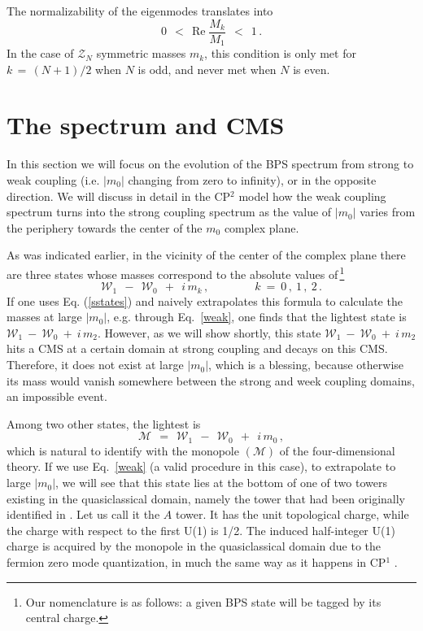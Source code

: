 \documentclass[epsfig,12pt]{article}
\def\beq{\begin{equation}}
\def\eeq{\end{equation}}
\def\beq{\begin{equation}}
\def\eeq{\end{equation}}
\newcommand{\mc}[1]{\mathcal{#1}}
\newcommand{\W}{\mathcal{W}}
\newcommand{\M}{\mathcal{M}}
\begin{document}
	The normalizability of the eigenmodes translates into
\beq
\label{norm}
	0 ~~<~~ \text{Re}\; \frac{ M_k }
                                 { M_1 } ~~<~~ 1\,.
\eeq
	In the case of $ \mc{Z}_N $ symmetric masses $ m_k $, this condition is only met for $ k \,=\, (N+1)/2 $
	when $ N $ is odd, and never met when $ N $ is even.


\section{The spectrum and CMS}
\label{secspectrum}
\setcounter{equation}{0}

	In this section we will focus on the
	evolution of the BPS spectrum from strong to weak coupling (i.e. $|m_0|$ changing from zero to infinity),
	or in the opposite direction.
	We will discuss in detail in the CP$^2$ model how the weak coupling  
	spectrum turns into the strong  coupling  
	spectrum as the value of  $| m_0| $ varies 
	from the periphery towards the center of the $m_0$ complex plane.

	As was indicated earlier, in the vicinity of the center of the complex plane there are three states
	whose masses correspond to the absolute values of\,\footnote{Our nomenclature is as follows: a given BPS state will be tagged by its central charge.}
\beq
\label{sstates}
	\W_1 ~~-~~ \W_0   ~~+~~ i\, m_k\,,   \qquad\qquad k ~=~ 0\,,~1\,,~2\,.
\eeq
	If one uses Eq. (\ref{sstates}) and  naively extrapolates this formula to calculate  the  masses at large $ |m_0| $, e.g. through Eq.~\eqref{weak},
	one  finds that the lightest state is $ \W_1 ~-~ \W_0 ~+~ i\, m_2 $.
	However, as we will show shortly, this state $ \W_1 ~-~ \W_0 ~+~ i\, m_2 $ hits a CMS at a certain domain at strong coupling
	and decays on this CMS. Therefore, it does not exist at large  $ |m_0| $, which is a blessing, because otherwise
	 its mass would vanish somewhere between the strong and week coupling domains, an impossible event.
	
	Among two other  states, the lightest is
\beq
\label{monopole}
	\M ~~=~~ \W_1 ~~-~~ \W_0   ~~+~~ i\, m_0\,,
\eeq
	which is natural to identify with the monopole $({\mathcal M})$ of the four-dimensional theory.
	If we use Eq.~\eqref{weak} (a valid procedure in this case), to extrapolate to
	large $|m_0|$, we will see that this state lies at the bottom of one of two towers existing 
	in the quasiclassical domain, namely the tower that had been originally identified in \cite{Dorey:1998yh}.
	Let us call it the $A$ tower.  It has the unit topological charge, while the charge with respect to the first U(1) is
	1/2. The induced half-integer U(1) charge is acquired by the monopole in the quasiclassical domain
	due to the fermion zero mode quantization, in much the same way as it happens in CP$^1$ \cite{SVZw}.
	
\end{document}
